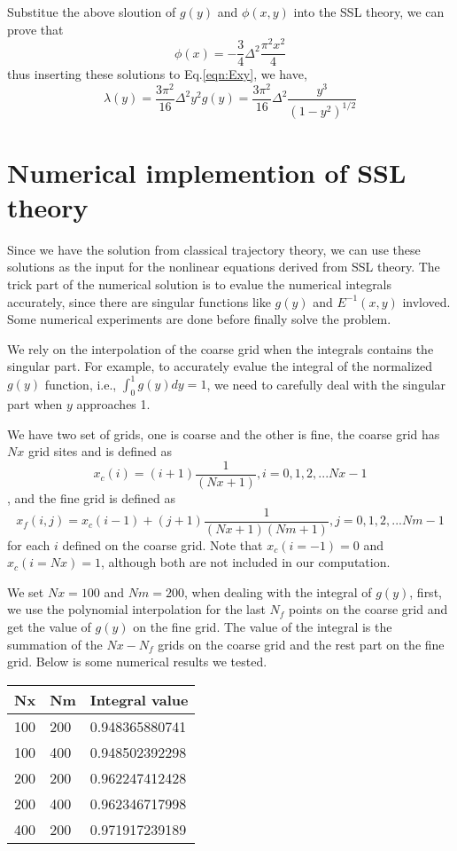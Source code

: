 \documentclass{article}
\begin{document}
Substitue the above sloution of $g(y)$ and $\phi(x,y)$ into the SSL theory,
we can prove that 
\begin{equation}
 \phi(x)=-\frac{3}{4}\Delta^{2}\frac{\pi^2 x^2}{4}
\end{equation}
thus inserting these solutions to Eq.\ref{eqn:Exy}, we have,
\begin{equation}
 \lambda(y)=\frac{3\pi^2}{16}\Delta^2y^2g(y)=\frac{3\pi^2}{16}\Delta^2\frac{y^3}{(1-y^2)^{1/2}}
\end{equation}

\section{Numerical implemention of SSL theory}
Since we have the solution from classical trajectory theory, we can use these solutions as the input for the nonlinear 
equations derived from SSL theory. The trick part of the numerical solution is to evalue the numerical integrals 
accurately, since there are singular functions like $g(y)$ and $E^{-1}(x,y)$ invloved. Some numerical experiments are done before
finally solve the problem.

We rely on the interpolation of the coarse grid when the integrals contains the singular part.
For example, to accurately evalue the integral of the normalized $g(y)$ function, i.e.,
$\int^{1}_{0}g(y)dy=1$, we need to carefully deal with the singular part when $y$ approaches 1.

We have two set of grids, one is coarse and the other is fine, the coarse grid has $Nx$ grid sites and is defined as
\begin{equation}
 x_c(i)=(i+1)\frac{1}{(Nx+1)}, i=0,1,2,...Nx-1
\end{equation},
and the fine grid is defined as
\begin{equation}
 x_f(i,j)=x_c(i-1)+(j+1)\frac{1}{(Nx+1)(Nm+1)}, j=0,1,2,...Nm-1
 \end{equation}
 for each $i$ defined on the coarse grid.
Note that $x_c(i=-1)=0$ and $x_c(i=Nx)=1$, although both are not included in our computation.

We set $Nx=100$ and $Nm=200$, when dealing with the integral of $g(y)$, first, we use the polynomial  interpolation for 
the last $N_f$ points on the coarse grid and get the value of $g(y)$ on the fine grid. The value of the integral is
the summation of the $Nx-N_f$ grids on the coarse grid and the rest part on the fine grid.
Below is some numerical results we tested.
\begin{center}
    \begin{tabular}{ l | l | l |}
    \hline
    Nx & Nm & Integral value \\ \hline
     100 & 200 & 0.948365880741 \\ \hline
     100 & 400 & 0.948502392298 \\ \hline
     200 & 200 & 0.962247412428 \\ \hline
     200 & 400 & 0.962346717998 \\ \hline
     400 & 200 & 0.971917239189 \\ \hline
    \end{tabular}
\end{center}
\end{document}
